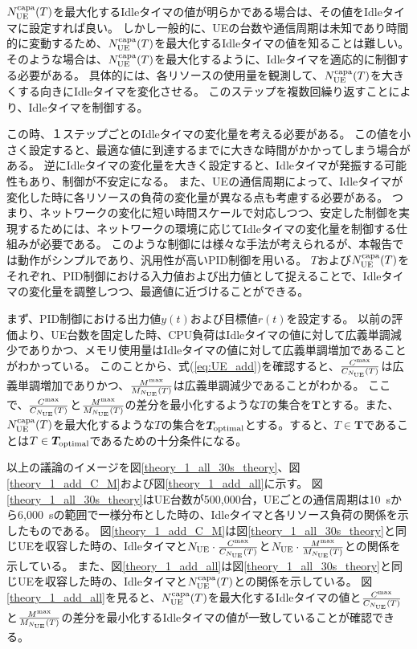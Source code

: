 \documentclass[a4j]{ujarticle}
\begin{document}
$N_{\rm UE}^{\rm capa}(T)$を最大化するIdleタイマの値が明らかである場合は、その値をIdleタイマに設定すれば良い。
しかし一般的に、UEの台数や通信周期は未知であり時間的に変動するため、$N_{\rm UE}^{\rm capa}(T)$を最大化するIdleタイマの値を知ることは難しい。
そのような場合は、$N_{\rm UE}^{\rm capa}(T)$を最大化するように、Idleタイマを適応的に制御する必要がある。
具体的には、各リソースの使用量を観測して、$N_{\rm UE}^{\rm capa}(T)$を大きくする向きにIdleタイマを変化させる。
このステップを複数回繰り返すことにより、Idleタイマを制御する。

この時、１ステップごとのIdleタイマの変化量を考える必要がある。
この値を小さく設定すると、最適な値に到達するまでに大きな時間がかかってしまう場合がある。
逆にIdleタイマの変化量を大きく設定すると、Idleタイマが発振する可能性もあり、制御が不安定になる。
また、UEの通信周期によって、Idleタイマが変化した時に各リソースの負荷の変化量が異なる点も考慮する必要がある。
つまり、ネットワークの変化に短い時間スケールで対応しつつ、安定した制御を実現するためには、ネットワークの環境に応じてIdleタイマの変化量を制御する仕組みが必要である。
このような制御には様々な手法が考えられるが、本報告では動作がシンプルであり、汎用性が高いPID制御を用いる。
$T$および$N_{\rm UE}^{\rm capa}(T)$をそれぞれ、PID制御における入力値および出力値として捉えることで、Idleタイマの変化量を調整しつつ、最適値に近づけることができる。

まず、PID制御における出力値$y(t)$および目標値$r(t)$を設定する。
以前の評価より、UE台数を固定した時、CPU負荷はIdleタイマの値に対して広義単調減少でありかつ、メモリ使用量はIdleタイマの値に対して広義単調増加であることがわかっている。
このことから、式(\ref{eq:UE_add})を確認すると、$\frac{C^{\rm max}}{C_{N_{\rm UE}}(T)}$は広義単調増加でありかつ、$\frac{M^{\rm max}}{M_{N_{\rm UE}}(T)}$は広義単調減少であることがわかる。
ここで、$\frac{C^{\rm max}}{C_{N_{\rm UE}}(T)}$と$\frac{M^{\rm max}}{M_{N_{\rm UE}}(T)}$の差分を最小化するような$T$の集合を$\bm{T}$とする。また、$N_{\rm UE}^{\rm capa}(T)$を最大化するような$T$の集合を$\bm{T}_{\rm optimal}$とする。すると、$T\in\bm{T}$であることは$T\in\bm{T}_{\rm optimal}$であるための十分条件になる。

以上の議論のイメージを図\ref{theory_1_all_30s_theory}、図\ref{theory_1_add_C_M}および図\ref{theory_1_add_all}に示す。
図\ref{theory_1_all_30s_theory}はUE台数が500,000台，UEごとの通信周期は10~sから6,000~sの範囲で一様分布とした時の、Idleタイマと各リソース負荷の関係を示したものである。
図\ref{theory_1_add_C_M}は図\ref{theory_1_all_30s_theory}と同じUEを収容した時の、Idleタイマと$N_{\rm UE} \cdot \frac{C^{\rm max}}{C_{N_{\rm UE}}(T)}$と$N_{\rm UE} \cdot \frac{M^{\rm max}}{M_{N_{\rm UE}}(T)}$との関係を示している。
また、図\ref{theory_1_add_all}は図\ref{theory_1_all_30s_theory}と同じUEを収容した時の、Idleタイマと$N_{\rm UE}^{\rm capa}(T)$との関係を示している。
図\ref{theory_1_add_all}を見ると、$N_{\rm UE}^{\rm capa}(T)$を最大化するIdleタイマの値と$\frac{C^{\rm max}}{C_{N_{\rm UE}}(T)}$と$\frac{M^{\rm max}}{M_{N_{\rm UE}}(T)}$の差分を最小化するIdleタイマの値が一致していることが確認できる。
\end{document}
